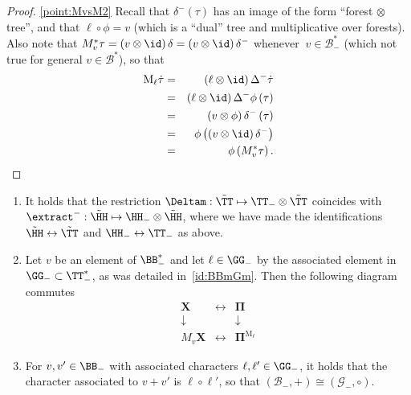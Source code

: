 \documentclass{article}
\begin{document}
\begin{proof}
\ref{point:MvsM2}  Recall that $\delta ^{-}\left( \tau \right) $ has an image of the form
``forest $\otimes $ tree'', and that $\ell \circ \phi = v$ (which is a ``dual'' tree and multiplicative over forests). Also note that $M^*_{v}\tau
=\left( v\otimes \id\right) \delta =\left( v\otimes \id\right) \delta ^{-}$
whenever $\ v\in \mathcal{B}_{-}^{\ast }$ (which not true for general $v\in 
\mathcal{B}^{\ast }$), so that  
\begin{eqnarray*}
\mathrm{M}_{\ell}\dot{\tau} &=&\left( \ell \otimes \id\right) \Delta ^{-}\dot{\tau}
\\
&=&\left( \ell \otimes \id\right) \Delta ^{-}\phi \left( \tau \right)  \\
&=&\left( v\otimes \phi \right) \delta ^{-}\left( \tau \right)  \\
&=&\phi \left( \left( v\otimes \id\right) \delta ^{-}\right)  \\
&=&\phi \left( M^*_{v}\tau \right).
\end{eqnarray*}


\end{proof} 


\begin{theorem}\label{thm:NegRenorm}
\begin{enumerate}[label=\upshape(\roman*\upshape)]
\item \label{point:Neg1} It holds that the restriction $\Deltam : \tilde \TT \mapsto \TT_-\otimes \tilde \TT$ coincides with $\extract^- : \tilde\HH \mapsto \HH_- \otimes \tilde\HH$, where we have made the identifications $\tilde\HH \leftrightarrow \tilde \TT$ and $\HH_- \leftrightarrow \TT_-$ as above.

\item \label{point:Neg2} Let $v$ be an element of $\BB_-^*$ and let $\ell \in \GG_-$  by the associated element in $\GG_- \subset \TT_-^*$, as was detailed in~\eqref{id:BBmGm}.
Then the following diagram commutes
\[
\begin{array}{lll}
\mathbf{X} & \longleftrightarrow  & \mathbf{\Pi } \\ 
\downarrow  &  & \downarrow  \\ 
M_{v}\mathbf{X} & \longleftrightarrow  & \mathbf{\Pi }^{\mathrm{M}_{\ell}}
\end{array}
\]

\item \label{point:Neg3} For $v,v' \in \BB_-$ with associated characters $\ell, \ell' \in \GG_-$, it holds that the character associated to $v+ v'$ is $\ell \circ \ell'$, so that $\left( \mathcal{B}_{-},+\right) \cong \left( \mathcal{G}_{-},\circ \right) $.
\end{enumerate}
\end{theorem}
\end{document}
